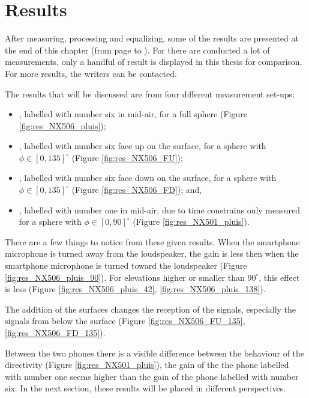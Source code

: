 \section{Results}
\label{sec:results}
After measuring, processing and equalizing, some of the results are presented at the end of this chapter (from page \pageref{fig:res_NX506_pluis} to \pageref{fig:res_NX501_pluis}).
For there are conducted a lot of measurements, only a handful of result is displayed in this thesis for comparison.
For more results, the writers can be contacted.

The results that will be discussed are from four different measurement set-ups:
\begin{itemize}
\item \nexus, labelled with number six in mid-air, for a full sphere (Figure \ref{fig:res_NX506_pluis});
\item \nexus, labelled with number six face up on the surface, for a sphere with $\phi\in[0,135]^\circ$ (Figure \ref{fig:res_NX506_FU});
\item \nexus, labelled with number six face down on the surface, for a sphere with $\phi\in[0,135]^\circ$ (Figure \ref{fig:res_NX506_FD}); and,
\item \nexus, labelled with number one in mid-air, due to time constrains only measured for a sphere with $\phi\in[0,90]^\circ$ (Figure \ref{fig:res_NX501_pluis}).
\end{itemize}

There are a few things to notice from these given results.
When the smartphone microphone is turned away from the loudspeaker, the gain is less then when the smartphone microphone is turned toward the loudspeaker (Figure \ref{fig:res_NX506_pluis_90}).
For elevations higher or smaller than $90^\circ$, this effect is less (Figure \ref{fig:res_NX506_pluis_42}, \ref{fig:res_NX506_pluis_138}).

The addition of the surfaces changes the reception of the signals, especially the signals from below the surface (Figure \ref{fig:res_NX506_FU_135}, \ref{fig:res_NX506_FD_135}).

Between the two phones there is a visible difference between the behaviour of the directivity (Figure \ref{fig:res_NX501_pluis}), the gain of the the phone labelled with number one seems higher than the gain of the phone labelled with number six.
In the next section, these results will be placed in different perspectives.